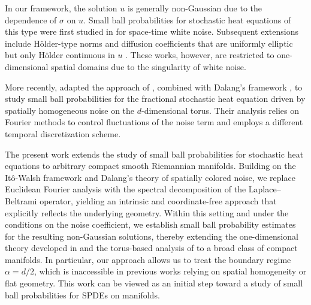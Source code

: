 \documentclass[12pt]{amsart}
\numberwithin{equation}{section}
\newcommand{\1}{\mathbf{1}}
\begin{document}
In our framework, the solution $u$ is generally non-Gaussian due to the dependence of $\sigma$ on $u$. Small ball probabilities for stochastic heat equations of this type were first studied in \cite{athreya2021small} for space-time white noise. Subsequent extensions include H\"older-type norms \cite{foondun2023small} and diffusion coefficients that are uniformly elliptic but only H\"older continuous in $u$ \cite{han2024support}. These works, however, are restricted to one-dimensional spatial domains due to the singularity of white noise.

More recently, \cite{chen2025small} adapted the approach of \cite{athreya2021small}, combined with Dalang’s framework \cite{dalang1999extending}, to study small ball probabilities for the fractional stochastic heat equation driven by spatially homogeneous noise on the $d$-dimensional torus. Their analysis relies on Fourier methods to control fluctuations of the noise term and employs a different temporal discretization scheme. 

The present work extends the study of small ball probabilities for stochastic heat equations to arbitrary compact smooth Riemannian manifolds. Building on the It\^o-Walsh framework and Dalang’s theory of spatially colored noise, we replace Euclidean Fourier analysis with the spectral decomposition of the Laplace–Beltrami operator, yielding an intrinsic and coordinate-free approach that explicitly reflects the underlying geometry. Within this setting and under the conditions on the noise coefficient, we establish small ball probability estimates for the resulting non-Gaussian solutions, thereby extending the one-dimensional theory developed in \cite{athreya2021small, foondun2023small, han2024support} and the torus-based analysis of \cite{chen2025small} to a broad class of compact manifolds. In particular, our approach allows us to treat the boundary regime $\alpha=d/2$, which is inaccessible in previous works relying on spatial homogeneity or flat geometry. This work can be viewed as an initial step toward a study of small ball probabilities for SPDEs on manifolds.
\end{document}
